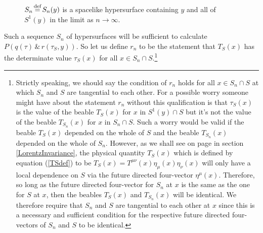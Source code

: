\begin{figure}[ht!]
\vspace*{2px}
\caption{$S_n\myeq S_n(y)$ is a spacelike hypersurface containing $y$ and all of $S^1(y)$ in the limit as $n\rightarrow\infty$.   }
\label{S3}
\end{figure}Such a sequence $S_n$ of hypersurfaces will be sufficient to calculate  $P(q(\tau) \, \&\,  r(\tau_S,y))$. So let us define $r_n$ to be the statement that  $T_S(x)$ has the determinate value $\tau_S(x)$ for all $x\in S_n\cap S$.\footnote{\label{tangentialnote}Strictly speaking, we should say the condition of $r_n$ holds for all $x\in S_n\cap S$ at which $S_n$ and $S$ are tangential to each other. For a possible worry someone might have about the statement $r_n$ without this qualification is that $\tau_S(x)$ is the value of the beable $T_S(x)$ for $x$ in $S^1(y)\cap S$ but it's not the value of the beable $T_{S_n}(x)$ for $x$ in $S_n\cap S$. Such a worry would be valid if the beable $T_S(x)$ depended on the whole of $S$ and the beable $T_{S_n}(x)$ depended on the whole of $S_n$. However, as we shall see on page \pageref{localdependenceS} in section \ref{LorentzInvariance}, the physical quantity $T_S(x)$ which is defined by equation (\ref{TSdef}) to be $T_S(x)=T^{\mu\nu}(x)\eta_{\mu}(x)\eta_{\nu}(x)$ will only have a local dependence on $S$ via the future directed four-vector $\eta^\mu(x)$. Therefore, so long as the future directed four-vector for $S_n$ at $x$ is the same as the one for $S$ at $x$, then the beables $T_{S}(x)$ and  $T_{S_n}(x)$ will be identical. We therefore require that $S_n$ and $S$ are tangential to each other at $x$ since this is a necessary and sufficient condition for the respective future directed four-vectors of $S_n$ and $S$ to be identical.
\newline
\newline
}
